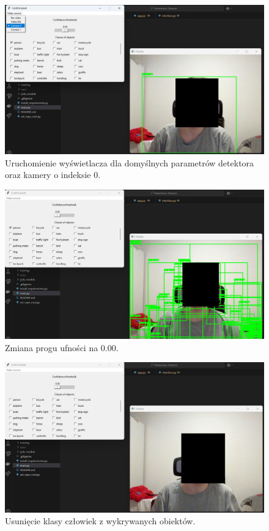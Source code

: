 \begin{figure}[H]
    \centering
    \includegraphics[width=\linewidth]{r_implementacja/panel_sterowania/camera_50.jpg}
    \caption{Uruchomienie wyświetlacza dla domyślnych parametrów detektora oraz kamery o indeksie 0.}
    \label{fig:mockup-3}
\end{figure}

\begin{figure}[H]
    \centering
    \includegraphics[width=\linewidth]{r_implementacja/panel_sterowania/camera_0.jpg}
    \caption{Zmiana progu ufności na 0.00.}
    \label{fig:mockup-4}
\end{figure}

\begin{figure}[H]
    \centering
    \includegraphics[width=\linewidth]{r_implementacja/panel_sterowania/camera_no_person.jpg}
    \caption{Usunięcie klasy człowiek z wykrywanych obiektów.}
    \label{fig:mockup-5}
\end{figure}
